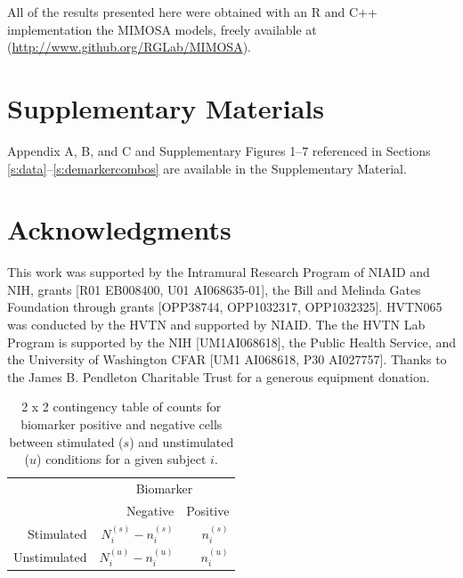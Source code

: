 \documentclass[12pt,oupdraft]{biostatistics}
\begin{document}
All of the results presented here were obtained with an R and C++ implementation the MIMOSA models, freely available at (\url{http://www.github.org/RGLab/MIMOSA}).

\section*{Supplementary Materials}

Appendix A, B, and C and Supplementary Figures 1--7 referenced in Sections \ref{s:data}--\ref{s:demarkercombos} are available in the Supplementary Material.\vspace*{-8pt}

\section*{Acknowledgments}
This work was supported by the Intramural Research Program of NIAID and NIH, grants [R01 EB008400, U01 AI068635-01], the Bill and Melinda Gates Foundation through grants [OPP38744,  OPP1032317, OPP1032325].  HVTN065 was conducted by the HVTN and supported by NIAID. The the HVTN Lab Program is supported by the NIH [UM1AI068618], the Public Health Service, and the University of Washington CFAR [UM1 AI068618, P30 AI027757]. Thanks to the James B. Pendleton Charitable Trust for a generous equipment donation.
\vspace{-10pt}

%

\clearpage
\begin{table}[ht]
\centering
\parbox{0.8\linewidth}{
\caption{2 x 2 contingency table of counts for biomarker positive and negative cells between stimulated ($s$) and unstimulated ($u$) conditions for a given subject $i$.}\label{tab:twobytwo}
\centering
\begin{tabular}{rrr}

  \hline
\multicolumn{1}{l}{}&
\multicolumn{2}{c}{Biomarker}\\
 & Negative & Positive \\
  \hline
Stimulated &   $N^{(s)}_{i} - n^{(s)}_{i}$ &   $n^{(s)}_{i}$ \\
Unstimulated &   $N^{(u)}_{i}-n^{(u)}_{i}$ &   $n^{(u)}_{i}$ \\
   \hline
\end{tabular}
}
\end{table}
\end{document}
